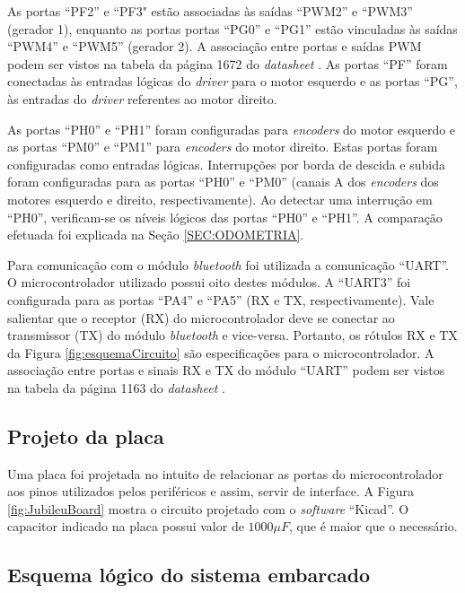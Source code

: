 	As portas ``PF2'' e ``PF3" estão associadas às saídas ``PWM2'' e ``PWM3'' (gerador
	1), enquanto as portas portas ``PG0'' e ``PG1'' estão vinculadas às saídas ``PWM4'' e 
	``PWM5'' (gerador 2). A associação entre portas e saídas PWM podem ser vistos na tabela 
	da página 1672 do \textit{datasheet} \cite{datasheet:TivaC}. As portas ``PF'' foram
	conectadas às entradas lógicas do \textit{driver} para o motor esquerdo e as portas 
	``PG'', às entradas do \textit{driver} referentes ao motor direito.

	As portas ``PH0'' e ``PH1'' foram configuradas para \textit{encoders} do motor esquerdo e
	as portas ``PM0'' e ``PM1'' para \textit{encoders} do motor direito. Estas portas foram 
	configuradas como entradas lógicas. Interrupções por borda de descida e subida foram
	configuradas para as portas ``PH0'' e ``PM0'' (canais A dos \textit{encoders} dos motores
	esquerdo e direito, respectivamente). Ao detectar uma interrução em ``PH0'', verificam-se 
	os níveis lógicos das portas ``PH0'' e ``PH1''. A comparação efetuada foi explicada na 
	Seção \ref{SEC:ODOMETRIA}.

	Para comunicação com o módulo \textit{bluetooth} foi utilizada a comunicação ``UART''. O
	microcontrolador utilizado possui oito destes módulos. A ``UART3'' foi configurada
	para as portas ``PA4'' e ``PA5'' (RX e TX, respectivamente). Vale salientar que o receptor
	(RX) do microcontrolador deve se conectar ao transmissor (TX) do módulo \textit{bluetooth} 
	e vice-versa. Portanto, os rótulos RX e TX da Figura \ref{fig:esquemaCircuito} são 
	especificações para o microcontrolador. A associação entre portas e sinais RX e TX do
	módulo ``UART'' podem ser vistos na tabela da página 1163 do \textit{datasheet} 
	\cite{datasheet:TivaC}. 
	
	\subsection{Projeto da placa}
	
	Uma placa foi projetada no intuito de relacionar as portas do microcontrolador
	aos pinos utilizados pelos periféricos e assim, servir de interface. A Figura 
	\ref{fig:JubileuBoard} mostra o circuito projetado com o \textit{software} ``Kicad''. 
	O capacitor indicado na placa possui valor de $1000 \mu F$, que é maior que o necessário.
	
	
	
	\subsection{Esquema lógico do sistema embarcado}
	
